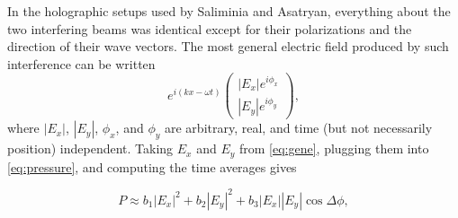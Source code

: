 \documentclass[twocolumn,showpacs,preprintnumbers,amsmath,amssymb]{revtex4}
\begin{document}
In the holographic setups used by Saliminia and Asatryan, everything
about the two interfering beams was identical except for their
polarizations and the direction of their wave vectors. The most
general electric field produced by such interference can be written
\begin{equation}
e^{i\left(kx-\omega t\right)} \left(
\begin{array}{c}
                                \left|E_x\right| e^{i\phi_x}\\
                                \left|E_y\right| e^{i\phi_y}
\end{array}
\right) \mathrm{,} \label{eq:gene}
\end{equation}
where $\left|E_x\right|$, $\left|E_y\right|$, $\phi_x$, and $\phi_y$  are arbitrary,
real, and time (but not necessarily position) independent. Taking $E_x$ and $E_y$ from
\ref{eq:gene}, plugging them into \ref{eq:pressure}, and computing the time averages
gives

\begin{equation}
\label{eq:soln}
P \approx b_1\left|E_x\right|^2 + b_2\left|E_y\right|^2 +b_3
\left|E_x\right|\left|E_y\right|\cos{\Delta\phi},
\end{equation}
\end{document}
